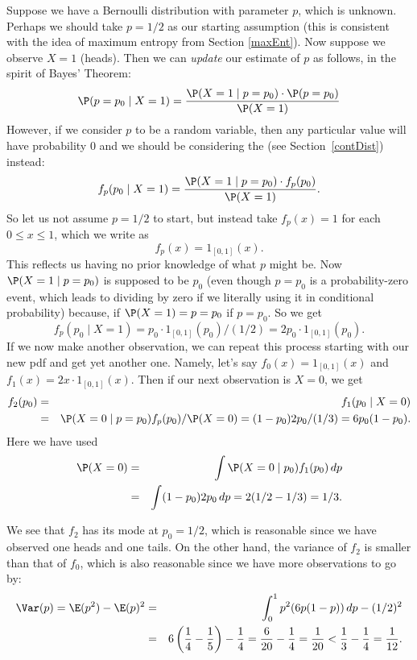 Suppose we have a Bernoulli distribution with parameter $p$, which is unknown.
Perhaps we should take $p=1/2$ as our starting assumption (this is consistent with the idea of maximum entropy from Section \ref{maxEnt}).
Now suppose we observe $X=1$ (heads). Then we can \emph{update} our estimate of $p$ as follows, in the spirit of Bayes' Theorem:
\[
	\P(p=p_0\mid X=1) = \frac{\P(X=1\mid p=p_0)\cdot \P(p=p_0)}{\P(X=1)}
\]
However, if we consider $p$ to be a random variable, then any particular value will have probability 0 and we should be considering the  (see Section~\ref{contDist}) instead:
\begin{equation}\label{learnBayes}
	f_p(p_0\mid X=1) = \frac{\P(X=1\mid p=p_0)\cdot f_p(p_0)}{\P(X=1)}.
\end{equation}
So let us not assume $p=1/2$ to start, but instead take $f_p(x)=1$ for each $0\le x\le 1$, which we write as
\[
f_p(x)=1_{[0,1]}(x).
\]
This reflects us having no prior knowledge of what $p$ might be.
Now $\P(X=1\mid p=p_0)$ is supposed to be $p_0$ (even though $p=p_0$ is a probability-zero event, which leads to dividing by zero if we literally using it in conditional probability)
because, if $\P(X=1)=p=p_0$ if $p=p_0$. So we get
\[
	f_p(p_0\mid X=1) = p_0 \cdot 1_{[0,1]}(p_0)/(1/2) = 2p_0\cdot 1_{[0,1]}(p_0).
\]
If we now make another observation, we can repeat this process starting with our new pdf and get yet another one.
Namely, let's say $f_0(x)=1_{[0,1]}(x)$ and $f_1(x)=2x\cdot 1_{[0,1]}(x)$.
Then if our next observation is $X=0$, we get
\begin{eqnarray*}
	f_2(p_0) &=& f_1(p_0\mid X=0)\\
	&=& \P(X=0\mid p=p_0)f_p(p_0)/\P(X=0) = (1-p_0) 2p_0 / (1/3) = 6p_0(1-p_0).
\end{eqnarray*}
Here we have used
\begin{eqnarray*}
	\P(X=0)&=&\int \P(X=0\mid p_0)f_1(p_0)\,dp\\
	&=& \int (1-p_0)2p_0\, dp = 2(1/2-1/3) = 1/3.
\end{eqnarray*}


We see that $f_2$ has its mode at $p_0=1/2$, which is reasonable since we have observed one heads and one tails.
On the other hand, the variance of $f_2$ is smaller than that of $f_0$, which is also reasonable since we have more observations to go by:
\begin{eqnarray*}
	\Var(p) = \E(p^2)-\E(p)^2 &=& \int_0^1 p^2 (6p(1-p))\,dp - (1/2)^2\\
	& =& 6\left(\frac14-\frac15\right)-\frac14 = \frac6{20}-\frac14 = \frac1{20} < \frac13-\frac14 = \frac1{12}.
\end{eqnarray*}

